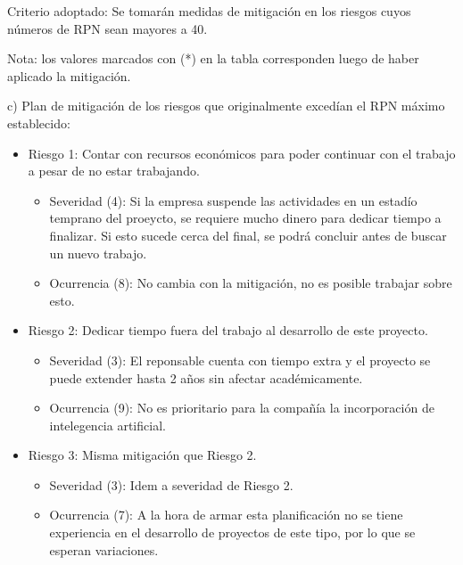 \documentclass[11pt]{charter}
\begin{document}
Criterio adoptado: 
Se tomarán medidas de mitigación en los riesgos cuyos números de RPN sean mayores a 40.

Nota: los valores marcados con (*) en la tabla corresponden luego de haber aplicado la mitigación.

c) Plan de mitigación de los riesgos que originalmente excedían el RPN máximo establecido:

\begin{itemize}
  \item Riesgo 1: Contar con recursos económicos para poder continuar con el trabajo a pesar de no estar trabajando.
  \begin{itemize}
    \item Severidad (4): Si la empresa suspende las actividades en un estadío temprano del proeycto, se
    requiere mucho dinero para dedicar tiempo a finalizar. Si esto sucede cerca del final, se podrá concluir
    antes de buscar un nuevo trabajo.
    \item Ocurrencia (8):  No cambia con la mitigación, no es posible trabajar sobre esto.
  \end{itemize}
\end{itemize}

\begin{itemize}
  \item Riesgo 2: Dedicar tiempo fuera del trabajo al desarrollo de este proyecto.
  \begin{itemize}
    \item Severidad (3): El reponsable cuenta con tiempo extra y el proyecto se puede extender hasta
    2 años sin afectar académicamente.
    \item Ocurrencia (9): No es prioritario para la compañía la incorporación de intelegencia artificial.
  \end{itemize}
\end{itemize}

\begin{itemize}
  \item Riesgo 3: Misma mitigación que Riesgo 2.
  \begin{itemize}
    \item Severidad (3): Idem a severidad de Riesgo 2.
    \item Ocurrencia (7): A la hora de armar esta planificación no se tiene experiencia en el desarrollo
    de proyectos de este tipo, por lo que se esperan variaciones.
  \end{itemize}
\end{itemize}
\end{document}
